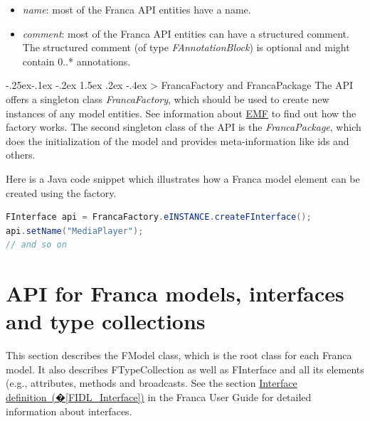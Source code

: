 \documentclass[a4paper,10pt]{scrreprt}
\makeatletter
\renewcommand\subsection{\medskip\@startsection{subsection}{2}{\z@}%
  {-.25ex\@plus -.1ex \@minus -.2ex}%
  {1.5ex \@plus .2ex \@minus -.4ex}%
  {\ifnum \scr@compatibility>\@nameuse{scr@v@2.96}\relax
    \setlength{\parfillskip}{\z@ plus 1fil}\fi
    \raggedsection\normalfont\sectfont\nobreak\size@subsection
  }%
}
\newlength{\XdocItemIndent}
\makeatother
\begin{document}
\setlength{\XdocItemIndent}{\textwidth}
\begin{itemize}
\addtolength{\XdocItemIndent}{-2.5em}
\item \begin{minipage}[t]{\XdocItemIndent}
\textit{name}: most of the Franca API entities have a name.

\end{minipage}
\item \begin{minipage}[t]{\XdocItemIndent}
\textit{comment}: most of the Franca API entities can have a structured comment.
		The structured comment (of type \textit{FAnnotationBlock}) is optional and
		might contain 0..* annotations. 

\end{minipage}
\end{itemize}
\addtolength{\XdocItemIndent}{2.5em}

\subsection{FrancaFactory and FrancaPackage}
\label{FrancaModelAPIReference_FactoryAndPackage}
The API offers a singleton class \textit{FrancaFactory}, which should be used
to create new instances of any model entities. See information about
\href{http://www.eclipse.org/modeling/emf/}{EMF} to find out how the
factory works. The second singleton class of the API is the \textit{FrancaPackage},
which does the initialization of the model and provides meta-information
like ids and others.

Here is a Java code snippet which illustrates how a Franca model element
can be created using the factory.


\begin{lstlisting}[language=Java]
FInterface api = FrancaFactory.eINSTANCE.createFInterface();
api.setName("MediaPlayer");
// and so on
\end{lstlisting}

\section{API for Franca models, interfaces and type collections}
\label{FrancaModelAPIReference_Section_FModel}
This section describes the FModel class, which is the root class for each Franca model.
			It also describes FTypeCollection as well as FInterface and all its elements (e.g.,
			attributes, methods and broadcasts.
			See the section \hyperref[FIDL_Interface]{Interface definition~(�\ref*{FIDL_Interface})} in the Franca User Guide for
			detailed information about interfaces.
\end{document}
